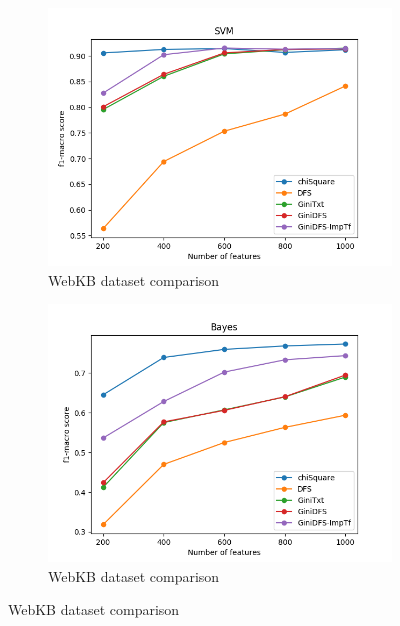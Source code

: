 \documentclass[a4paper, 14pt]{article}
\begin{document}
\begin{justify}
\begin{justify}
\begin{figure}[h!]
\centering
\begin{subfigure}{.5\textwidth}
  \centering
  \includegraphics[width=1.1\linewidth]{pf1_macro_webkb_svm.png}
  \caption{WebKB dataset comparison}
  \label{fig:sub1}
\end{subfigure}%
\begin{subfigure}{.5\textwidth}
  \includegraphics[width=1.1\linewidth]{pf1_macro_webkb_bayes.png}
  \caption{WebKB dataset comparison}
  \label{fig:sub2}
\end{subfigure}

\label{fig:test}

\end{figure}




\end{justify}
\end{justify}
\end{document}
